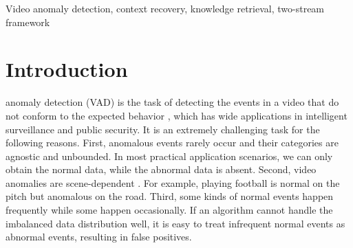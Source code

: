 \documentclass[lettersize,journal]{IEEEtran}
\begin{document}
\begin{IEEEkeywords}
Video anomaly detection, context recovery, knowledge retrieval, two-stream framework
\end{IEEEkeywords}

\section{Introduction}
 anomaly detection (VAD) is the task of detecting the events in a video that do not conform to the expected behavior \cite{SurveySingleScene2022ramachandra}, which has wide applications in intelligent surveillance and public security.
It is an extremely challenging task for the following reasons.
First, anomalous events rarely occur and their categories are agnostic and unbounded.
In most practical application scenarios, we can only obtain the normal data, while the abnormal data is absent.
Second, video anomalies are scene-dependent \cite{SurveySingleScene2022ramachandra}.
For example, playing football is normal on the pitch but anomalous on the road.
Third, some kinds of normal events happen frequently while some happen occasionally.
If an algorithm cannot handle the imbalanced data distribution well, it is easy to treat infrequent normal events as abnormal events, resulting in false positives.
\end{document}
